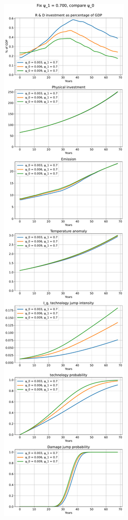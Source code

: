\documentclass{article}
\begin{document}
	\begin{figure}
		\centering
		\includegraphics{../figures/psi_1_0.700.pdf}
	\end{figure}
\end{document}

